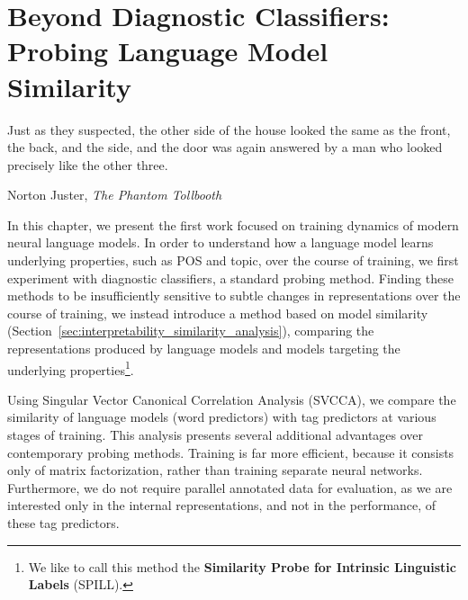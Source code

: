 \chapter{Beyond Diagnostic Classifiers: Probing Language Model Similarity} \label{chapter:svcca}



\epigraph{


Just as they suspected, the other side of the house looked the same as the front, the back, and the side, and the door was again answered by a man who looked precisely like the other three.}{Norton Juster, \textit{The Phantom Tollbooth}}

In this chapter, we present the first work focused on training dynamics of modern neural language models. In order to understand how a language model learns underlying properties, such as POS and topic, over the course of training, we first experiment with diagnostic classifiers, a standard probing method. Finding these methods to be insufficiently sensitive to subtle changes in representations over the course of training, we instead introduce a method based on model similarity (Section~\ref{sec:interpretability_similarity_analysis}), comparing the representations produced by language models and models targeting the underlying properties\footnote{We like to call this method the \textbf{Similarity Probe for Intrinsic Linguistic Labels} (SPILL).}.

Using Singular Vector Canonical Correlation Analysis (SVCCA), we compare the similarity of language models (word predictors) with tag predictors at various stages of training. This analysis presents several additional advantages over contemporary probing methods. Training is far more efficient, because it consists only of matrix factorization, rather than training separate neural networks. Furthermore, we do not require parallel annotated data for evaluation, as we are interested only in the internal representations, and not in the performance, of these tag predictors.

